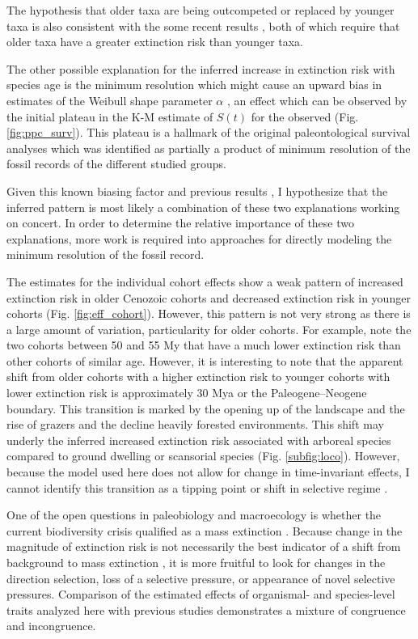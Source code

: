 \documentclass{nature}
\begin{document}
The hypothesis that older taxa are being outcompeted or replaced by younger taxa is also consistent with the some recent results \cite{Wagner2014b,Quental2013}, both of which require that older taxa have a greater extinction risk than younger taxa.

The other possible explanation for the inferred increase in extinction risk with species age is the minimum resolution which might cause an upward bias in estimates of the Weibull shape parameter \(\alpha\) \cite{Sepkoski1975}, an effect which can be observed by the initial plateau in the K-M estimate of \(S(t)\) for the observed (Fig. \ref{fig:ppc_surv}). This plateau is a hallmark of the original paleontological survival analyses \cite{VanValen1973} which was identified as partially a product of minimum resolution of the fossil records of the different studied groups.

Given this known biasing factor and previous results \cite{Wagner2014b,Quental2013}, I hypothesize that the inferred pattern is most likely a combination of these two explanations working on concert. In order to determine the relative importance of these two explanations, more work is required into approaches for directly modeling the minimum resolution of the fossil record.

The estimates for the individual cohort effects show a weak pattern of increased extinction risk in older Cenozoic cohorts and decreased extinction risk in younger cohorts (Fig. \ref{fig:eff_cohort}). However, this pattern is not very strong as there is a large amount of variation, particularity for older cohorts. For example, note the two cohorts between 50 and 55 My that have a much lower extinction risk than other cohorts of similar age. However, it is interesting to note that the apparent shift from older cohorts with a higher extinction risk to younger cohorts with lower extinction risk is approximately 30 Mya or the Paleogene--Neogene boundary. This transition is marked by the opening up of the landscape and the rise of grazers and the decline heavily forested environments. This shift may underly the inferred increased extinction risk associated with arboreal species compared to ground dwelling or scansorial species (Fig. \ref{subfig:loco}). However, because the model used here does not allow for change in time-invariant effects, I cannot identify this transition as a tipping point or shift in selective regime \cite{Barnosky2012a,Barnosky2011}.

One of the open questions in paleobiology and macroecology is whether the current biodiversity crisis qualified as a mass extinction \cite{Alroy2010,Barnosky2011,Barnosky2012a}. Because change in the magnitude of extinction risk is not necessarily the best indicator of a shift from background to mass extinction \cite{Wang2003}, it is more fruitful to look for changes in the direction selection, loss of a selective pressure, or appearance of novel selective pressures. Comparison of the estimated effects of organismal- and species-level traits analyzed here with previous studies demonstrates a mixture of congruence and incongruence. 
\end{document}

